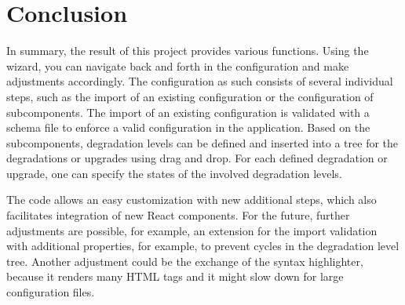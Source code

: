 \chapter{Conclusion}

In summary, the result of this project provides various functions. Using the wizard, you can navigate back and forth in the configuration and make adjustments accordingly. The configuration as such consists of several individual steps, such as the import of an existing configuration or the configuration of subcomponents. The import of an existing configuration is validated with a schema file to enforce a valid configuration in the application. Based on the subcomponents, degradation levels can be defined and inserted into a tree for the degradations or upgrades using drag and drop. For each defined degradation or upgrade, one can specify the states of the involved degradation levels.

The code allows an easy customization with new additional steps, which also facilitates integration of new React components. For the future, further adjustments are possible, for example, an extension for the import validation with additional properties, for example, to prevent cycles in the degradation level tree. Another adjustment could be the exchange of the syntax highlighter, because it renders many HTML tags and it might slow down for large configuration files.
